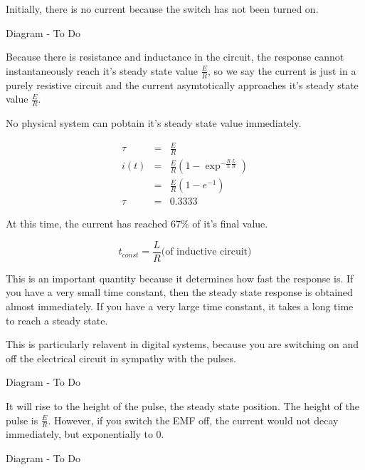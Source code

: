 \documentclass[a4paper,12pt]{article}
\begin{document}
Initially, there is no current because the switch has not been turned
on.

\begin{table}[hbtp]

Diagram - To Do

\end{table}

Because there is resistance and inductance in the circuit, the response
cannot instantaneously reach it's steady state value $\frac{E}{R}$, so
we say the current is just in a purely resistive circuit and the current
asymtotically approaches it's steady state value $\frac{E}{R}$.

No physical system can pobtain it's steady state value immediately.

\begin{eqnarray*}
\tau & = & \frac{E}{R} \\
i(t) & = & \frac{E}{R} \left( 1 - \exp^{- \frac{R}{L} \frac{L}{R}}
\right) \\
	  & = & \frac{E}{R} \left( 1 - e^{-1} \right) \\
\tau & = & 0.3333
\end{eqnarray*}

At this time, the current has reached $67\%$ of it's final value.

\[ t_{const} = \frac{L}{R} \mbox{(of inductive circuit)} \]

This is an important quantity because it determines how fast the
response is. If you have a very small time constant, then the steady
state response is obtained almost immediately. If you have a very large
time constant, it takes a long time to reach a steady state.

This is particularly relavent in digital systems, because you are
switching on and off the electrical circuit in sympathy with the pulses.

\begin{table}[hbtp]

Diagram - To Do

\end{table}

It will rise to the height of the pulse, the steady state position. The
height of the pulse is $\frac{E}{R}$. However, if you switch the EMF
off, the current would not decay immediately, but exponentially to $0$.

\begin{table}[hbtp]

Diagram - To Do

\end{table}
\end{document}

